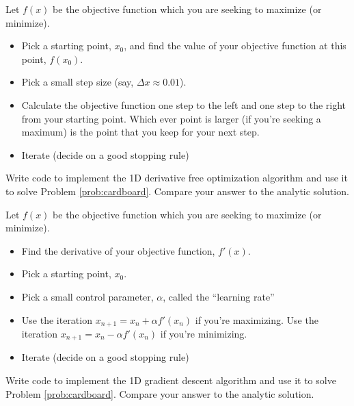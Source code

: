 \begin{algorithm}
    Let $f(x)$ be the objective function which you are seeking to maximize (or minimize).
    \begin{itemize}
        \item Pick a starting point, $x_0$, and find the value of your
            objective function at this point, $f(x_0)$.
        \item Pick a small step size (say, $\Delta x \approx 0.01$).
        \item Calculate the objective function one step to the left and
            one step to the right from your starting point.  Which ever
            point is larger (if you're seeking a maximum) is the point
            that you keep for your next step.
        \item Iterate (decide on a good stopping rule)
    \end{itemize}
\end{algorithm}
\begin{problem}
    Write code to implement the 1D derivative free optimization algorithm and use it to solve
    Problem \ref{prob:cardboard}.  Compare your answer to the analytic solution.
\end{problem}

\begin{algorithm}
    Let $f(x)$ be the objective function which you are seeking to maximize (or minimize).
    \begin{itemize}
        \item Find the derivative of your objective function, $f'(x)$.
        \item Pick a starting point, $x_0$.
        \item Pick a small control parameter, $\alpha$, called the ``learning rate''
        \item Use the iteration $x_{n+1} = x_n + \alpha f'(x_n) $ if you're maximizing.
            Use the iteration $x_{n+1} = x_n - \alpha f'(x_n)$ if you're minimizing.
        \item Iterate (decide on a good stopping rule)
    \end{itemize}
\end{algorithm}
\begin{problem}
    Write code to implement the 1D gradient descent algorithm and use it to solve
    Problem \ref{prob:cardboard}. Compare your answer to the analytic solution.
\end{problem}


